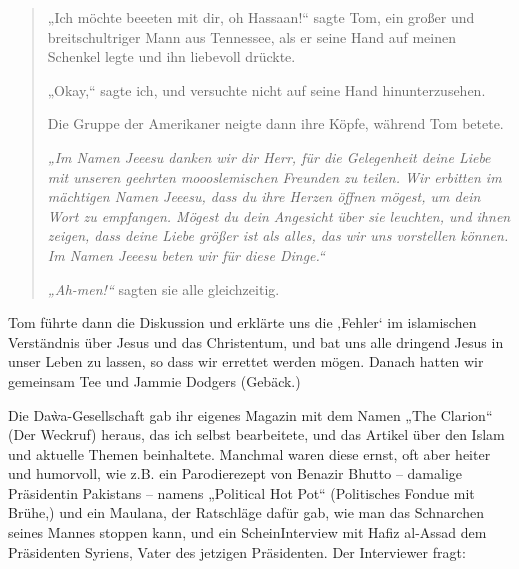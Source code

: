 \documentclass[12pt]{memoir}
\begin{document}
\begin{quote}
„Ich möchte beeeten mit dir, oh Hassaan!“ sagte Tom,
ein großer und breitschultriger Mann aus Tennessee,
als er seine Hand auf meinen Schenkel legte und ihn liebevoll drückte.

„Okay,“ sagte ich, und versuchte nicht auf seine Hand hinunterzusehen.

Die Gruppe der Amerikaner neigte dann ihre Köpfe, während Tom betete.

\emph{„Im Namen Jeeesu danken wir dir Herr,
für die Gelegenheit deine Liebe
mit unseren geehrten moooslemischen Freunden zu teilen.
Wir erbitten im mächtigen Namen Jeeesu,
dass du ihre Herzen öffnen mögest, um dein Wort zu empfangen.
Mögest du dein Angesicht über sie leuchten,
und ihnen zeigen, dass deine Liebe größer ist als alles,
das wir uns vorstellen können.
Im Namen Jeeesu beten wir für diese Dinge.“}

\emph{„Ah-men!“} sagten sie alle gleichzeitig.
\end{quote}

Tom führte dann die Diskussion und erklärte uns die ‚Fehler‘
im islamischen Verständnis über Jesus und das Christentum,
und bat uns alle dringend Jesus in unser Leben zu lassen,
so dass wir errettet werden mögen.
Danach hatten wir gemeinsam Tee und Jammie Dodgers (Gebäck.)

Die Da\`wa-Gesellschaft gab ihr eigenes Magazin
mit dem Namen „The Clarion“ (Der Weckruf) heraus,
das ich selbst bearbeitete, und das Artikel
über den Islam und aktuelle Themen beinhaltete.
Manchmal waren diese ernst, oft aber heiter und humorvoll,
wie z.B. ein Parodierezept von Benazir Bhutto –
damalige Präsidentin Pakistans – namens „Political Hot Pot“
(Politisches Fondue mit Brühe,)
und ein Maulana, der Ratschläge dafür gab,
wie man das Schnarchen seines Mannes stoppen kann,
und ein Schein\–Interview mit Hafiz al-Assad dem Präsidenten Syriens,
Vater des jetzigen Präsidenten.
Der Interviewer fragt:
\end{document}
